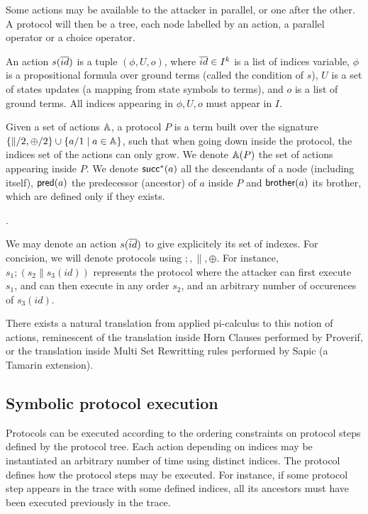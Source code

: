 Some actions may be available to the attacker in parallel, or one
after the other. A protocol will then be a tree, each node labelled by an 
action, a parallel operator or a choice operator.

\begin{definition}
  An action $s(\overline{id})$ is a tuple $(\phi,U,o)$, where $\overline{id} \in I^k$ is a 
  list of indices variable, $\phi$ is a propositional formula over ground 
  terms (called the condition of $s$), $U$ is a set of states updates (a 
  mapping from state symbols to terms), and $o$ is a list of ground terms.
  All indices appearing in $\phi,U,o$ must appear in $I$.

  Given a set of actions $\mathbb{A}$, a protocol $P$ is a term built over the 
  signature $\{\|/2,\oplus/2\} \cup \{a/1 \mid a \in \mathbb{A}\}$, such that 
  when going down inside the protocol, the indices set of the actions can only 
  grow. We denote $\mathbb{A}(P)$ the set of actions appearing inside $P$. We 
  denote $\textsf{succ}^*(a)$ all the descendants of a node (including itself), 
  $\textsf{pred}(a)$ the predecessor (ancestor) of $a$ inside $P$ and $\textsf{brother}(a)$ its 
  brother, which are defined only if they exists.
\end{definition}.

We may denote an action $s(\overline{id})$ to give explicitely its set of indexes.
For concision, we will denote protocols using $;,\|,\oplus$. For instance, 
$s_1; (s_2 \| s_3(id))$ represents the protocol where the attacker can first 
execute $s_1$, and can then execute in any order $s_2$, and an arbitrary 
number of occurences of $s_3(id)$.

There exists a natural translation from applied pi-calculus to this notion of 
actions, reminescent of the translation inside Horn Clauses performed by 
Proverif, or the translation inside Multi Set Rewritting rules performed by 
Sapic (a Tamarin extension).

\subsection{Symbolic protocol execution}

Protocols can be executed according to the ordering constraints on protocol 
steps defined by the protocol tree.
Each action depending on indices may be instantiated an arbitrary number of 
time using distinct indices. The protocol defines how the protocol steps may 
be executed. For instance, if some protocol step appears in
the trace with some defined indices, all its ancestors must have been executed 
previously in the trace.


